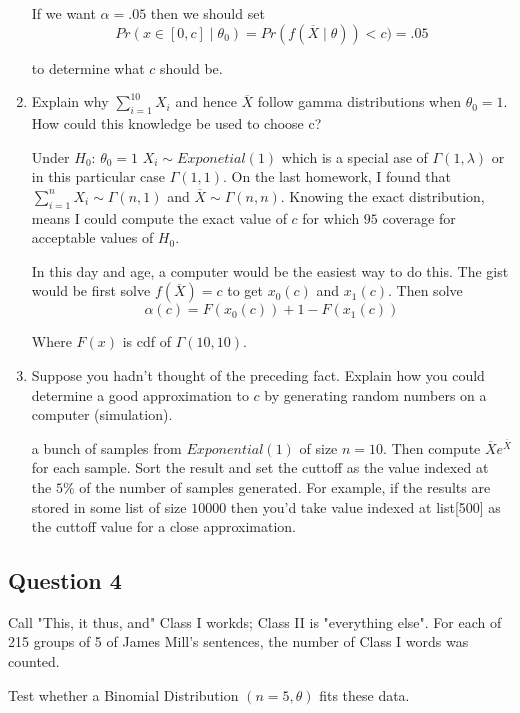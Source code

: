 \documentclass{tufte-book}
\theoremstyle{mytheoremstyle}
\theoremstyle{mylemstyle}
\theoremstyle{mydefstyle}
\begin{document}
\begin{enumerate}
If we want $\alpha=.05$ then we should set
\[ Pr(x \in [0, c] \mid \theta_0) = Pr(f(\overline{X} \mid \theta)) < c) = .05 \]

to determine what $c$ should be.

\item Explain why $\sum_{i=1}^10 X_i$ and hence $\overline{X}$ follow gamma distributions when $\theta_0=1$.  How could this knowledge be used to choose c?

Under $H_0$: $\theta_0=1$ $X_i \sim Exponetial(1)$ which is a special ase of $\Gamma(1,\lambda)$ or in this particular case $\Gamma(1,1)$.  On the last homework, I found that $\sum_{i=1}^n X_i \sim \Gamma(n,1)$ and $\overline{X} \sim \Gamma(n,n)$.  Knowing the exact distribution, means I could compute the exact value of $c$ for which $95$ coverage for acceptable values of $H_0$.

In this day and age, a computer would be the easiest way to do this.  The gist would be first solve $f(\overline{X})=c$ to get $x_0(c)$ and $x_1(c)$.  Then solve
\[ \alpha(c) = F(x_0(c)) + 1-F(x_1(c)) \]

Where $F(x)$ is cdf of $\Gamma(10,10)$.

\item Suppose you hadn't thought of the preceding fact.  Explain how you could determine a good approximation to $c$ by generating random numbers on a computer (simulation).

 a bunch of samples from $Exponential(1)$ of size $n=10$.  Then compute $\overline{X}e^{\overline{X}}$ for each sample. Sort the result and set the cuttoff as the value indexed at the $5\%$ of the number of samples generated.  For example, if the results are stored in some list of size $10000$ then you'd take value indexed at list[500] as the cuttoff value for a close approximation.
\end{enumerate}

\subsection{Question 4}

Call "This, it thus, and" Class I workds; Class II is "everything else".   For each of 215 groups of 5 of James Mill's sentences, the number of Class I words was counted.

Test whether a Binomial Distribution $(n=5, \theta)$ fits these data.
\end{document}
